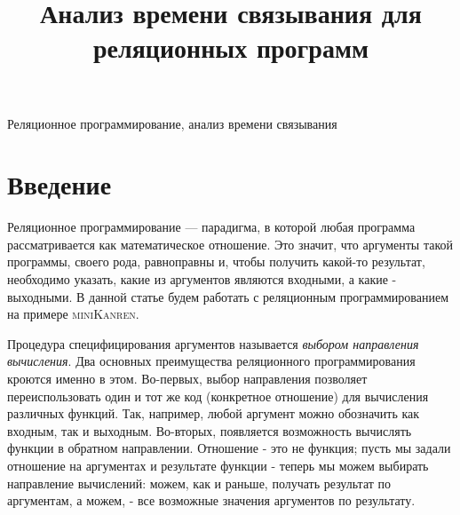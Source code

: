 \documentclass[conference]{IEEEtran}
\begin{document}
\newcommand{\miniKanren}{\textsc{miniKanren}}
\newcommand{\mercury}{\textsc{mercury}}


\title{Анализ времени связывания для реляционных программ}

\author{
\and
{}

}

\maketitle

\begin{abstract}
    
\end{abstract}

\begin{IEEEkeywords}
Реляционное программирование, анализ времени связывания
\end{IEEEkeywords}

\section{Введение}

Реляционное программирование — парадигма, в которой любая программа рассматривается как математическое отношение. Это значит, что аргументы такой программы, своего рода, равноправны и, чтобы получить какой-то результат, необходимо указать, какие из аргументов являются входными, а какие - выходными. В данной статье будем работать с реляционным программированием на примере \miniKanren.

Процедура специфицирования аргументов называется \emph{выбором направления вычисления}. Два основных преимущества реляционного программирования кроются именно в этом. Во-первых, выбор направления позволяет переиспользовать один и тот же код (конкретное отношение) для вычисления различных функций. Так, например, любой аргумент можно обозначить как входным, так и выходным. Во-вторых, появляется возможность вычислять функции в обратном направлении. Отношение - это не функция; пусть мы задали отношение на аргументах и результате функции - теперь мы можем выбирать направление вычислений: можем, как и раньше, получать результат по аргументам, а можем, - все возможные значения аргументов по результату.
\end{document}
